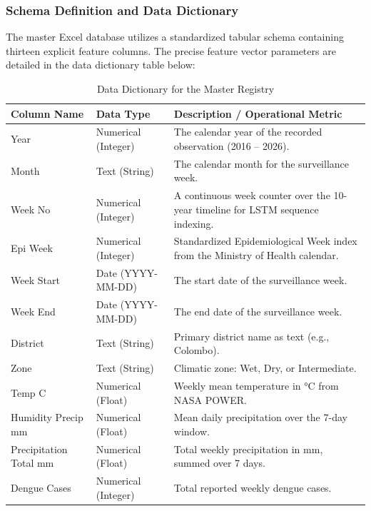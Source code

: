 \documentclass[12pt,a4paper]{article}
\begin{document}
\subsubsection{Schema Definition and Data Dictionary}
The master Excel database utilizes a standardized tabular schema containing thirteen explicit feature columns. The precise feature vector parameters are detailed in the data dictionary table below:

\begin{table}[h]
\centering
\caption{Data Dictionary for the Master Registry}
\small
\setlength{\tabcolsep}{3pt}
\begin{tabularx}{\textwidth}{|L{3.0cm}|L{2.3cm}|X|}
\hline
\textbf{Column Name} & \textbf{Data Type} & \textbf{Description / Operational Metric} \\ \hline
Year & Numerical (Integer) & The calendar year of the recorded observation (2016 -- 2026). \\ \hline
Month & Text (String) & The calendar month for the surveillance week. \\ \hline
Week No & Numerical (Integer) & A continuous week counter over the 10-year timeline for LSTM sequence indexing. \\ \hline
Epi Week & Numerical (Integer) & Standardized Epidemiological Week index from the Ministry of Health calendar. \\ \hline
Week Start & Date (YYYY-MM-DD) & The start date of the surveillance week. \\ \hline
Week End & Date (YYYY-MM-DD) & The end date of the surveillance week. \\ \hline
District & Text (String) & Primary district name as text (e.g., Colombo). \\ \hline
Zone & Text (String) & Climatic zone: Wet, Dry, or Intermediate. \\ \hline
Temp C & Numerical (Float) & Weekly mean temperature in °C from NASA POWER. \\ \hline
Humidity %
Precip mm & Numerical (Float) & Mean daily precipitation over the 7-day window. \\ \hline
Precipitation Total mm & Numerical (Float) & Total weekly precipitation in mm, summed over 7 days. \\ \hline
Dengue Cases & Numerical (Integer) & Total reported weekly dengue cases. \\ \hline
\end{tabularx}
\end{table}
\end{document}
